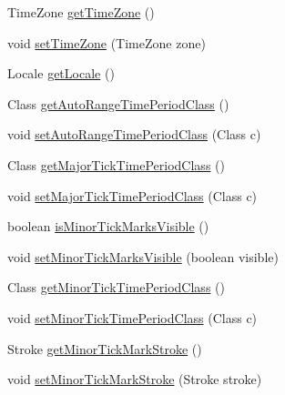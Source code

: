 \begin{DoxyCompactItemize}
\item 
Time\+Zone \mbox{\hyperlink{classorg_1_1jfree_1_1chart_1_1axis_1_1_period_axis_a10fa951007dabbf8e8778d992d7164a4}{get\+Time\+Zone}} ()
\item 
void \mbox{\hyperlink{classorg_1_1jfree_1_1chart_1_1axis_1_1_period_axis_a325d11ac01c07becac6efbb1a8e07095}{set\+Time\+Zone}} (Time\+Zone zone)
\item 
Locale \mbox{\hyperlink{classorg_1_1jfree_1_1chart_1_1axis_1_1_period_axis_ab05eea6920716abe72a479ecee1e0829}{get\+Locale}} ()
\item 
Class \mbox{\hyperlink{classorg_1_1jfree_1_1chart_1_1axis_1_1_period_axis_abd775d70847623310012a3d2c8e4af31}{get\+Auto\+Range\+Time\+Period\+Class}} ()
\item 
void \mbox{\hyperlink{classorg_1_1jfree_1_1chart_1_1axis_1_1_period_axis_a30b07163f324c959c0a0508d869f79e4}{set\+Auto\+Range\+Time\+Period\+Class}} (Class c)
\item 
Class \mbox{\hyperlink{classorg_1_1jfree_1_1chart_1_1axis_1_1_period_axis_a29fa347d96e848f0bfde70d27aad56bd}{get\+Major\+Tick\+Time\+Period\+Class}} ()
\item 
void \mbox{\hyperlink{classorg_1_1jfree_1_1chart_1_1axis_1_1_period_axis_acdfd62e99d5f1512b32bf5cc7ef96e35}{set\+Major\+Tick\+Time\+Period\+Class}} (Class c)
\item 
boolean \mbox{\hyperlink{classorg_1_1jfree_1_1chart_1_1axis_1_1_period_axis_aa99bf2aefbdc6e2909fc66539dfe921a}{is\+Minor\+Tick\+Marks\+Visible}} ()
\item 
void \mbox{\hyperlink{classorg_1_1jfree_1_1chart_1_1axis_1_1_period_axis_aad81a1dcb543fc4369dc23a7cecc10d8}{set\+Minor\+Tick\+Marks\+Visible}} (boolean visible)
\item 
Class \mbox{\hyperlink{classorg_1_1jfree_1_1chart_1_1axis_1_1_period_axis_a7996411a9e7873c093819bc80ad45b61}{get\+Minor\+Tick\+Time\+Period\+Class}} ()
\item 
void \mbox{\hyperlink{classorg_1_1jfree_1_1chart_1_1axis_1_1_period_axis_a4016fafa1276f624b8d835ef9b6c6433}{set\+Minor\+Tick\+Time\+Period\+Class}} (Class c)
\item 
Stroke \mbox{\hyperlink{classorg_1_1jfree_1_1chart_1_1axis_1_1_period_axis_aebb299a944d7ef036725a201f935eb91}{get\+Minor\+Tick\+Mark\+Stroke}} ()
\item 
void \mbox{\hyperlink{classorg_1_1jfree_1_1chart_1_1axis_1_1_period_axis_abb0b6e3b8ca6500fb4315224265c6298}{set\+Minor\+Tick\+Mark\+Stroke}} (Stroke stroke)
\item 

\end{DoxyCompactItemize}
